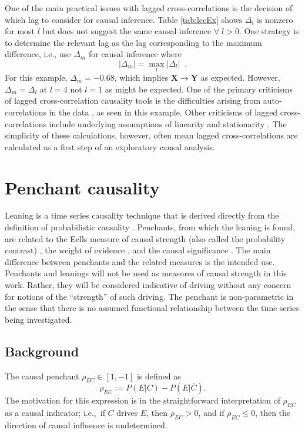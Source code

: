 One of the main practical issues with lagged cross-correlations is the decision of which lag to consider for causal inference.  Table \ref{tab:lccEx} shows $\Delta_l$ is nonzero for most $l$ but does not suggest the same causal inference $\forall\;l>0$.  One strategy is to determine the relevant lag as the lag corresponding to the maximum difference, i.e., use $\Delta_{m}$ for causal inference where
\begin{equation}
|\Delta_{m}| = \max_l |\Delta_l|\;\;.
\end{equation}
For this example, $\Delta_m = - 0.68$, which implies $\mathbf{X}\rightarrow\mathbf{Y}$ as expected.  However, $\Delta_m=\Delta_l$ at $l=4$ not $l=1$ as might be expected.  One of the primary criticisms of lagged cross-correlation causality tools is the difficulties arising from auto-correlations in the data \cite{Mcnames2007,Runge2014}, as seen in this example.  Other criticisms of lagged cross-correlations include underlying assumptions of linearity \cite{Mcnames2007} and stationarity \cite{Rogosa1980}.  The simplicity of these calculations, however, often mean lagged cross-correlations are calculated as a first step of an exploratory causal analysis.  

\section{Penchant causality}
\label{sec:lean}
Leaning is a time series causality technique that is derived directly from the definition of probabilistic causality \cite{Suppes1970}.  Penchants, from which the leaning is found, are related to the Eells measure of causal strength (also called the probability contrast) \cite{Illari2011}, the weight of evidence \cite{Good1984}, and the causal significance \cite{Kleinberg2012}.  The main difference between penchants and the related measures is the intended use.  Penchants and leanings will not be used as measures of causal strength in this work.  Rather, they will be considered indicative of driving without any concern for notions of the ``strength'' of such driving.  The penchant is non-parametric in the sense that there is no assumed functional relationship between the time series being investigated.

\subsection{Background}
The causal penchant $\rho_{EC}\in\left[1,-1\right]$ is defined as
\begin{equation}
\label{eq:pen}
\rho_{EC} := P\left(E|C\right) - P\left(E|\bar{C}\right).
\end{equation}
The motivation for this expression is in the straightforward interpretation of $\rho_{EC}$ as a causal indicator; i.e.,\ if $C$ drives $E$, then $\rho_{EC} > 0$, and if $\rho_{EC} \le 0$, then the direction of causal influence is undetermined.    

